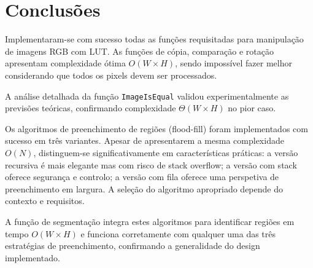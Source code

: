 \documentclass[12pt,a4paper]{article}
\begin{document}
\section{Conclusões}

Implementaram-se com sucesso todas as funções requisitadas para manipulação de imagens RGB com LUT. As funções de cópia, comparação e rotação apresentam complexidade ótima $O(W \times H)$, sendo impossível fazer melhor considerando que todos os pixels devem ser processados.

A análise detalhada da função \texttt{ImageIsEqual} validou experimentalmente as previsões teóricas, confirmando complexidade $\Theta(W \times H)$ no pior caso. 

Os algoritmos de preenchimento de regiões (flood-fill) foram implementados com sucesso em três variantes. Apesar de apresentarem a mesma complexidade $O(N)$, distinguem-se significativamente em características práticas: a versão recursiva é mais elegante mas com risco de stack overflow; a versão com stack oferece segurança e controlo; a versão com fila oferece uma perspetiva de preenchimento em largura. A seleção do algoritmo apropriado depende do contexto e requisitos.

A função de segmentação integra estes algoritmos para identificar regiões em tempo $O(W \times H)$ e funciona corretamente com qualquer uma das três estratégias de preenchimento, confirmando a generalidade do design implementado.
\end{document}
